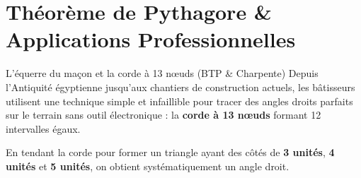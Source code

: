 \chapter{Théorème de Pythagore \& Applications Professionnelles}

\begin{activite}{L'équerre du maçon et la corde à 13 n\oe uds (BTP \& Charpente)}
Depuis l'Antiquité égyptienne jusqu'aux chantiers de construction actuels, les bâtisseurs utilisent une technique simple et infaillible pour tracer des angles droits parfaits sur le terrain sans outil électronique : la \textbf{corde à 13 n\oe uds} formant 12 intervalles égaux.

En tendant la corde pour former un triangle ayant des côtés de \textbf{3 unités}, \textbf{4 unités} et \textbf{5 unités}, on obtient systématiquement un angle droit.

\begin{center}
\end{center}


\end{activite}
